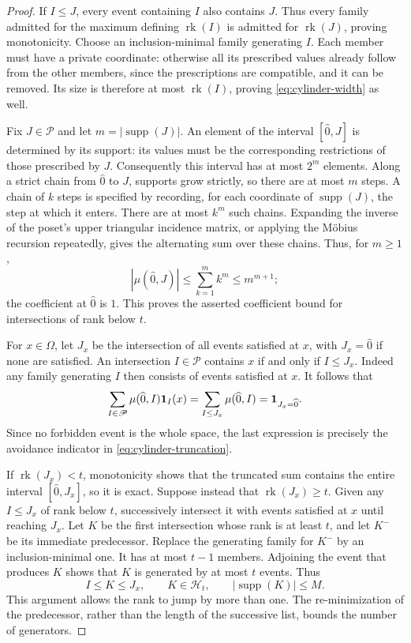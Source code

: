 \begin{proof}
If $I\le J$, every event containing $I$ also contains $J$.  Thus every
family admitted for the maximum defining $\operatorname{rk}(I)$ is
admitted for $\operatorname{rk}(J)$, proving monotonicity.
Choose an inclusion-minimal family generating $I$.  Each member must
have a private coordinate: otherwise all its prescribed values already
follow from the other members, since the prescriptions are compatible,
and it can be removed.  Its size is therefore at most
$\operatorname{rk}(I)$, proving \eqref{eq:cylinder-width} as well.

Fix $J\in\mathscr P$ and let $m=|\operatorname{supp}(J)|$.  An element
of the interval $[\widehat0,J]$ is determined by its support: its values
must be the corresponding restrictions of those prescribed by $J$.
Consequently this interval has at most $2^m$ elements.  Along a strict
chain from $\widehat0$ to $J$, supports grow strictly, so there are at
most $m$ steps.  A chain of $k$ steps is specified by recording, for
each coordinate of $\operatorname{supp}(J)$, the step at which it
enters.  There are at most $k^m$ such chains.  Expanding the inverse of
the poset's upper triangular incidence matrix, or applying the M\"obius
recursion repeatedly, gives the alternating sum over these chains.
Thus, for $m\ge1$,
\begin{equation}\label{eq:cylinder-mobius}
 |\mu(\widehat0,J)|\le\sum_{k=1}^m k^m\le m^{m+1};
\end{equation}
the coefficient at $\widehat0$ is $1$.  This proves the asserted
coefficient bound for intersections of rank below $t$.

For $x\in\Omega$, let $J_x$ be the intersection of all events satisfied
at $x$, with $J_x=\widehat0$ if none are satisfied.  An intersection
$I\in\mathscr P$ contains $x$ if and only if $I\le J_x$.  Indeed any
family generating $I$ then consists of events satisfied at $x$.
It follows that
\begin{equation}\label{eq:cylinder-full-sum}
 \sum_{I\in\mathscr P}\mu(\widehat0,I)\mathbf 1_I(x)
    =\sum_{I\le J_x}\mu(\widehat0,I)
    =\mathbf 1_{J_x=\widehat0}.
\end{equation}
Since no forbidden event is the whole space, the last expression is
precisely the avoidance indicator in \eqref{eq:cylinder-truncation}.

If $\operatorname{rk}(J_x)<t$, monotonicity shows that the truncated
sum contains the entire interval $[\widehat0,J_x]$, so it is exact.
Suppose instead that $\operatorname{rk}(J_x)\ge t$.  Given any
$I\le J_x$ of rank below $t$, successively intersect it with events
satisfied at $x$ until reaching $J_x$.  Let $K$ be the first intersection
whose rank is at least $t$, and let $K^-$ be its immediate predecessor.
Replace the generating family for $K^-$ by an inclusion-minimal one.
It has at most $t-1$ members.  Adjoining the event that produces $K$
shows that $K$ is generated by at most $t$ events.  Thus
\[
       I\le K\le J_x,\qquad K\in\mathscr H_t,
       \qquad |\operatorname{supp}(K)|\le M.
\]
This argument allows the rank to jump by more than one.  The
re-minimization of the predecessor, rather than the length of the
successive list, bounds the number of generators.


\end{proof}
